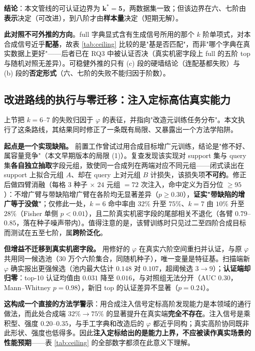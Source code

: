 \documentclass[10.5pt,compsoc,UTF8]{CjC}
\theoremstyle{mystyle}
\begin{document}
\textbf{结论}：本文管线的可认证边界为 $\boldsymbol{k^\ast=5}$，两数据集一致；但该边界在六、七阶由\textbf{表示}决定（可改进），到八阶才由\textbf{样本量}决定（短期无解）。

\textbf{此对照不可外推的方向}。full 字典显式含有生成信号所用的那个 $k$ 阶单项式，对本合成信号近乎\textbf{配基}，故表 \ref{tab:ceiling} 比较的是"基是否匹配"，而非"哪个字典在真实数据上更好"——后者已在 RQ3 中被认证否决（真实机密字段上 full 的五阶 top 与随机对照无差异）。可稳健外推的只有 (c) 段的硬墙结论（连配基都失败）与 (b) 段的\textbf{否定形式}（六、七阶的失败不能归因于阶数）。

\subsection{改进路线的执行与零迁移：注入定标高估真实能力}
\label{sec:transfer}

上节把 $k=6$--$7$ 的失败归因于 $\varphi$ 的表征，并指向"改造元训练任务分布"。本文执行了这条路线，其结果同时修正了一条既有局限、又暴露出一个方法学陷阱。

\textbf{起点是一个实现缺陷。} 前置工作曾试过用合成目标增广元训练，结论是"修不好、属容量竞争"（本文早期版本的局限 (1)）。复查发现该实现对 support 集与 query 集\textbf{各自独立抽取}字段元组，致使同一合成列在两端对应不同元组——闭式读出在 support 上拟合元组 $A$、却在 query 上对元组 $B$ 计损失，该损失项\textbf{不可约}。修正后做四臂消融（每格 $3$ 种子 $\times$ $24$ 元组 $=72$ 次注入，命中定义为百分位 $\ge95$）：不增广臂与带缺陷增广臂在各阶均无显著差异（$p\ge0.30$），\textbf{证实"带缺陷的增广等于没做"}；仅修此一处，$k=6$ 命中率由 $32\%$ 升至 $75\%$、$k=7$ 由 $10\%$ 升至 $28\%$（Fisher 单侧 $p<0.01$），且二阶真实机密字段的尾部相关不退化（各臂 $0.79$--$0.85$，落在种子噪声带内）。值得注意的是，该臂训练时只见过二至四阶合成目标而测试在五至七阶，属\textbf{跨阶泛化}。

\textbf{但增益不迁移到真实机密字段。} 用修好的 $\varphi$ 在真实六阶空间重扫并认证，与原 $\varphi$ 共用同一候选池（$30$ 万个六阶集合，同随机种子），唯一变量是特征基。扫描端新 $\varphi$ 确实报出更强候选（池内最大估计 $0.148$ 对 $0.107$，超阈候选 $3\to9$）；\textbf{认证端却归零}：top-10 认证均值由 $0.031$ 降至 $0.016$，与对照组无法分开（AUC $0.30$，Mann--Whitney $p=0.98$），新旧 top 的认证差异不显著（$p=0.24$）。

\textbf{这构成一个直接的方法学警示}：用合成注入信号定标高阶发现能力是本领域的通行做法，而此处合成端 $32\%\to75\%$ 的显著提升在真实端\textbf{完全不存在}。注入信号是乘积型、强度 $0.20$--$0.35$，与手工字典和改造后的 $\varphi$ 都近乎同构；真实高阶协同既非此形状、强度也低得多。因此\textbf{注入定标给出的是能力上界，不应被读作真实场景的性能预期}——表 \ref{tab:ceiling} 的全部数字都须在此意义下理解。
\end{document}
